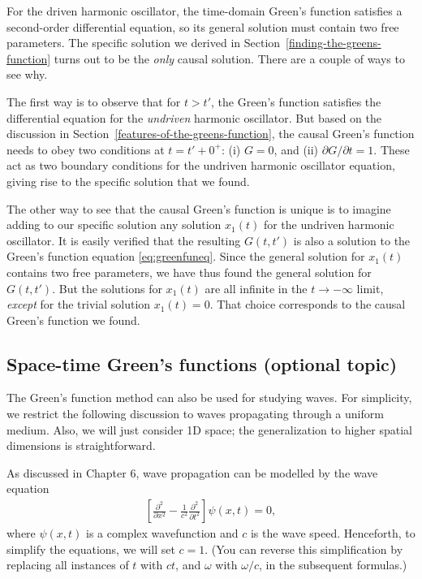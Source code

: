 \documentclass[10pt,a4paper]{article}
\begin{document}
For the driven harmonic oscillator, the time-domain Green's function
satisfies a second-order differential equation, so its general
solution must contain two free parameters.  The specific solution we
derived in Section~\ref{finding-the-greens-function} turns out to be
the \textit{only} causal solution. There are a couple of ways to see
why.

The first way is to observe that for $t > t'$, the Green's function
satisfies the differential equation for the \textit{undriven} harmonic
oscillator. But based on the discussion in
Section~\ref{features-of-the-greens-function}, the causal Green's
function needs to obey two conditions at $t = t' + 0^+$: (i) $G = 0$,
and (ii) $\partial G / \partial t = 1$. These act as two boundary
conditions for the undriven harmonic oscillator equation, giving rise
to the specific solution that we found.

The other way to see that the causal Green's function is unique is to
imagine adding to our specific solution any solution $x_1(t)$ for the
undriven harmonic oscillator.  It is easily verified that the
resulting $G(t,t')$ is also a solution to the Green's function
equation \eqref{eq:greenfuneq}. Since the general solution for
$x_1(t)$ contains two free parameters, we have thus found the general
solution for $G(t,t')$. But the solutions for $x_1(t)$ are all
infinite in the $t \rightarrow -\infty$ limit, \textit{except} for the
trivial solution $x_1(t) = 0$. That choice corresponds to the causal
Green's function we found.

\subsection{Space-time Green's functions (optional topic)}
\label{space-time-greens-functions}

The Green's function method can also be used for studying waves. For
simplicity, we restrict the following discussion to waves propagating
through a uniform medium. Also, we will just consider 1D space; the
generalization to higher spatial dimensions is straightforward.

As discussed in Chapter 6, wave propagation can be modelled by the
wave equation
\begin{align}
  \left[\frac{\partial^2}{\partial x^2} - \frac{1}{c^2} \frac{\partial^2}{\partial t^2} \right] \psi(x,t) = 0,
\end{align}
where $\psi(x,t)$ is a complex wavefunction and $c$ is the wave
speed. Henceforth, to simplify the equations, we will set $c = 1$.
(You can reverse this simplification by replacing all instances of $t$
with $c t$, and $\omega$ with $\omega/c$, in the subsequent formulas.)
\end{document}
